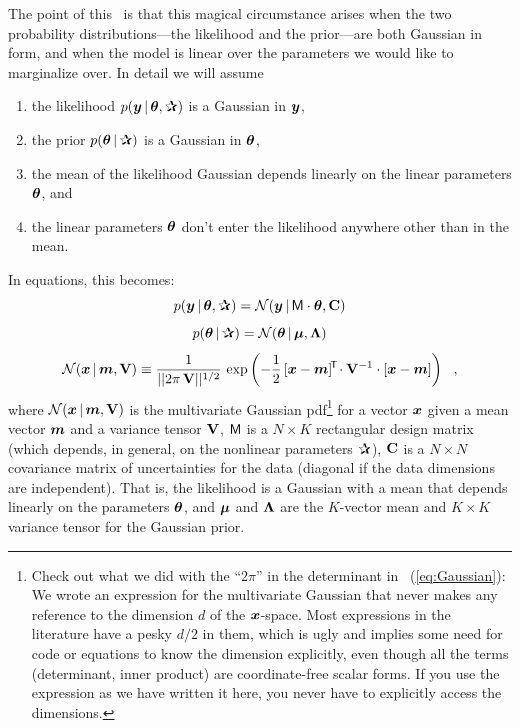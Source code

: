 The point of this \documentname\ is that this magical circumstance
arises when the two probability
distributions---the likelihood and the prior---are both Gaussian in
form, and when the model is linear over the parameters we would like to marginalize over.
In detail we will assume
\begin{enumerate}
\item
the likelihood $p(\vy\given\vtheta,\bP)$ is a Gaussian in $\boldsymbol{y}$,
\item
the prior $p(\vtheta\given\bP)$ is a Gaussian in $\boldsymbol{\theta}$,
\item
the mean of the likelihood Gaussian depends linearly on the linear
parameters $\boldsymbol{\theta}$, and
\item
the linear parameters $\boldsymbol{\theta}$ don't enter the likelihood anywhere
other than in the mean.
\end{enumerate}
In equations, this becomes:
\begin{equation}
p(\vy\given\vtheta,\bP) = \normal(\vy\given\mM\cdot\vtheta,\tC)
\end{equation}
\begin{equation}
p(\vtheta\given\bP) = \normal(\vtheta\given\vmu,\tLambda)
\end{equation}
\begin{equation}\label{eq:Gaussian}
\mathcal{N}\!\,(\boldsymbol{x}\,|\,\boldsymbol{m},\mathbf{V}) \equiv \frac{1}{||2\pi\,\mathbf{V}||^{1/2}}\,\exp\left(-\frac{1}{2}\,[\boldsymbol{x}-\boldsymbol{m}]^{\!\mathsf{T}\!} \cdot \mathbf{V}^{-1} \cdot [\boldsymbol{x} - \boldsymbol{m}]\right)
~~,
\end{equation}
where $\mathcal{N}\!\,(\boldsymbol{x}\,|\,\boldsymbol{m},\mathbf{V})$ is the multivariate Gaussian
pdf\footnote{Check out what we did with the ``$2\pi$'' in the determinant in
  \equationname~(\ref{eq:Gaussian}): We wrote an expression for the
  multivariate Gaussian that never makes any reference to the
  dimension $d$ of the $\boldsymbol{x}$-space. Most expressions in the literature
  have a pesky $d/2$ in them, which is ugly and implies some need for
  code or equations to know the dimension explicitly, even though all
  the terms (determinant, inner product) are coordinate-free scalar
  forms. If you use the expression as we have written it here, you never
  have to explicitly access the dimensions.} for a vector $\boldsymbol{x}$
given a mean vector $\boldsymbol{m}$ and a variance tensor $\mathbf{V}$,
$\mathsf{M}$ is a $N\times K$ rectangular design matrix (which depends, in
general, on the nonlinear parameters $\bP$),
$\mathbf{C}$ is a $N\times N$ covariance matrix of uncertainties for the
data (diagonal if the data dimensions are independent).
That is, the likelihood is a Gaussian with a mean that depends
linearly on the parameters $\boldsymbol{\theta}$, and
$\boldsymbol{\mu}$ and $\mathbf{\Lambda}$ are the $K$-vector mean and $K\times K$ variance tensor
for the Gaussian prior.

